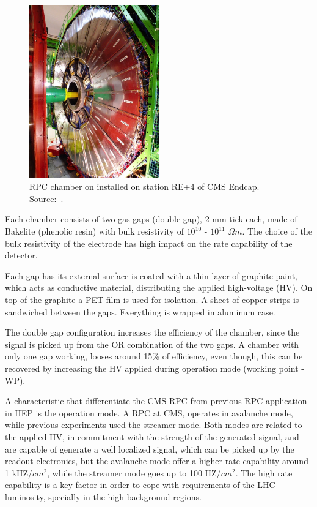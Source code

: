\begin{figure}[h]
    \begin{center}
    \includegraphics[width=0.5\textwidth,keepaspectratio]{figures_and_tables/rpc/picture_rpc.jpg}
    \end{center}
    \caption{RPC chamber on installed on station RE+4 of CMS Endcap. Source:~\cite{rpc_picture}.}
    \label{picture_rpc}
\end{figure}


Each chamber consists of two gas gaps (double gap), 2 mm tick each, made of Bakelite (phenolic resin) with bulk resistivity of $10^{10}$ - $10^{11}$ $\Omega m$. The choice of the bulk resistivity of the electrode has high impact on the rate capability of the detector.

Each gap has its external surface is coated with a thin layer of graphite paint, which acts as conductive material, distributing the applied high-voltage (HV). On top of the graphite a PET film is used for isolation. A sheet of copper strips is sandwiched between the gaps. Everything is wrapped in aluminum case.

The double gap configuration increases the efficiency of the chamber, since the signal is picked up from the OR combination of the two gaps. A chamber with only one gap working, looses around 15\% of efficiency, even though, this can be recovered by increasing the HV applied during operation mode (working point - WP).

A characteristic that differentiate the CMS RPC from previous RPC application in HEP is the operation mode. A RPC at CMS, operates in avalanche mode, while previous experiments used the streamer mode. Both modes are related to the applied HV, in commitment with the strength of the generated signal, and are capable of generate a well localized signal, which can be picked up by the readout electronics, but the avalanche mode offer a higher rate capability around 1 kHZ/$cm^2$, while the streamer mode goes up to 100 HZ/$cm^2$. The high rate capability is a key factor in order to cope with requirements of the LHC luminosity, specially in the high background regions.

